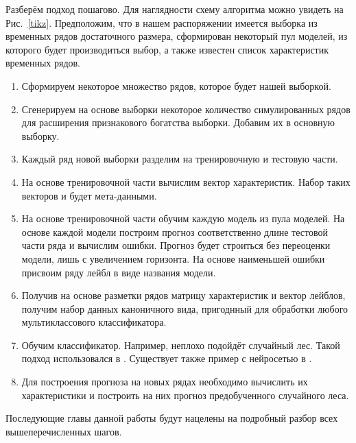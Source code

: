 \documentclass[a4paper,12pt]{article}
\begin{document}
Разберём подход пошагово. Для наглядности схему алгоритма можно увидеть на Рис.~\ref{tikz}. Предположим, что в нашем распоряжении имеется выборка из временных рядов достаточного размера, сформирован некоторый пул моделей, из которого будет производиться выбор, а также известен список характеристик временных рядов.

\begin{enumerate}
	\item Сформируем некоторое множество рядов, которое будет нашей выборкой. 
	
	\item Сгенерируем на основе выборки некоторое количество симулированных рядов для расширения признакового богатства выборки. Добавим их в основную выборку.
	
	\item Каждый ряд новой выборки разделим на тренировочную и тестовую части.
	
	\item На основе тренировочной части вычислим вектор характеристик. Набор таких векторов и будет мета-данными.
	
	\item На основе тренировочной части обучим каждую модель из пула моделей. На основе каждой модели построим прогноз соответственно длине тестовой части ряда и вычислим ошибки. Прогноз будет строиться без переоценки модели, лишь с увеличением горизонта. На основе наименьшей ошибки присвоим ряду лейбл в виде названия модели. 
	
	\item Получив на основе разметки рядов матрицу характеристик и вектор лейблов, получим набор данных каноничного вида, пригоднный для обработки любого мультиклассового классификатора. 
	
	\item Обучим классификатор. Например, неплохо подойдёт случайный лес. Такой подход использовался в \cite{start}. Существует также пример с нейросетью в \cite{neural}.
	
	\item Для построения прогноза на новых рядах необходимо вычислить их характеристики и построить на них прогноз предобученного случайного леса.
	
	
\end{enumerate}

Последующие главы данной работы будут нацелены на подробный разбор всех вышеперечисленных шагов. 




\newpage
\end{document}
